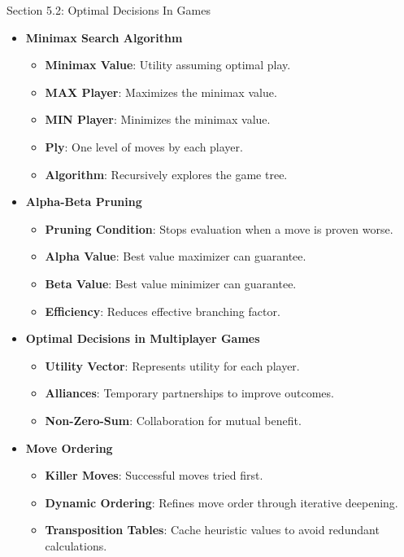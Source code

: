 \begin{notes}{Section 5.2: Optimal Decisions In Games}
\begin{highlight}
        \begin{itemize}
            \item \textbf{Minimax Search Algorithm}
                \begin{itemize}
                    \item \textbf{Minimax Value}: Utility assuming optimal play.
                    \item \textbf{MAX Player}: Maximizes the minimax value.
                    \item \textbf{MIN Player}: Minimizes the minimax value.
                    \item \textbf{Ply}: One level of moves by each player.
                    \item \textbf{Algorithm}: Recursively explores the game tree.
                \end{itemize}
            \item \textbf{Alpha-Beta Pruning}
                \begin{itemize}
                    \item \textbf{Pruning Condition}: Stops evaluation when a move is proven worse.
                    \item \textbf{Alpha Value}: Best value maximizer can guarantee.
                    \item \textbf{Beta Value}: Best value minimizer can guarantee.
                    \item \textbf{Efficiency}: Reduces effective branching factor.
                \end{itemize}
            \item \textbf{Optimal Decisions in Multiplayer Games}
                \begin{itemize}
                    \item \textbf{Utility Vector}: Represents utility for each player.
                    \item \textbf{Alliances}: Temporary partnerships to improve outcomes.
                    \item \textbf{Non-Zero-Sum}: Collaboration for mutual benefit.
                \end{itemize}
            \item \textbf{Move Ordering}
                \begin{itemize}
                    \item \textbf{Killer Moves}: Successful moves tried first.
                    \item \textbf{Dynamic Ordering}: Refines move order through iterative deepening.
                    \item \textbf{Transposition Tables}: Cache heuristic values to avoid redundant calculations.
                \end{itemize}
        \end{itemize}
    \end{highlight}
\end{notes}

